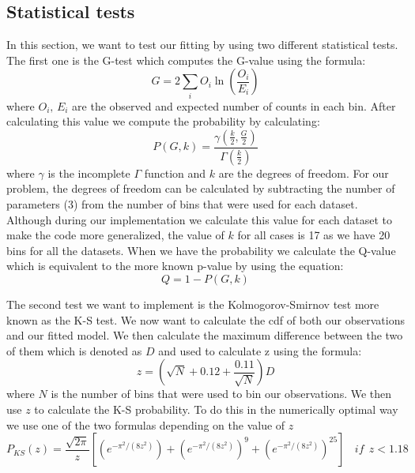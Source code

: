 \documentclass[a4paper,10pt]{article}
\begin{document}


\subsection{Statistical tests}
\label{chap:stat}

In this section, we want to test our fitting by using two different statistical tests. The first one is the G-test which computes the G-value using the formula:
\begin{equation}
  G = 2 \sum_{i} O_i \ln(\frac{O_i}{E_i})
\end{equation}
where $O_i,\, E_i$ are the observed and expected number of counts in each bin. After calculating this value we compute the probability by calculating:
\begin{equation}
  P(G,k) = \frac{\gamma(\frac{k}{2},\frac{G}{2})}{\Gamma(\frac{k}{2})}
\end{equation}
where $\gamma$ is the incomplete $\Gamma$ function and $k$ are the degrees of freedom. For our problem, the degrees of freedom can be calculated by subtracting the number of parameters (3) from the number of bins that were used for each dataset. Although during our implementation we calculate this value for each dataset to make the code more generalized, the value of $k$ for all cases is 17 as we have 20 bins for all the datasets. When we have the probability we calculate the Q-value which is equivalent to the more known p-value by using the equation:
\begin{equation}
  \label{eq:Q}
  Q = 1 - P(G,k)
\end{equation}

The second test we want to implement is the Kolmogorov-Smirnov test more known as the K-S test. We now want to calculate the cdf of both our observations and our fitted model. We then calculate the maximum difference between the two of them which is denoted as $D$ and used to calculate z using the formula:
\begin{equation}
  z = (\sqrt{N}+0.12+\frac{0.11}{\sqrt{N}}) D
\end{equation}
where $N$ is the number of bins that were used to bin our observations. We then use $z$ to calculate the K-S probability. To do this in the numerically optimal way we use one of the two formulas depending on the value of $z$ 
\begin{equation}
  P_{KS}(z) = \frac{\sqrt{2 \pi}}{z}[(e^{-\pi^2/(8z^2)})+(e^{-\pi^2/(8z^2)})^9+(e^{-\pi^2/(8z^2)})^25]\:\:\:\: if \:\: z<1.18
\end{equation}
\end{document}
